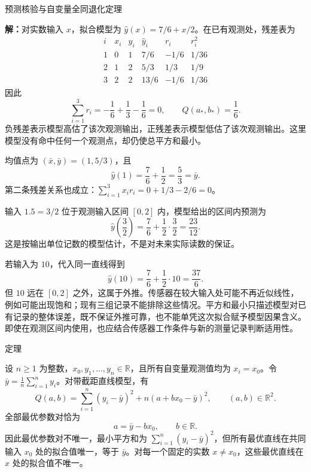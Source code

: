 \documentclass[aspectratio=169,10pt,fontset=fandol]{ctexbeamer}
\begin{document}
\begin{frame}[t,fragile]{预测核验与自变量全同退化定理}
\footnotesize
{\footnotesize
\par\noindent\textbf{解：}对实数输入 $x$，拟合模型为 $\hat{y}(x)=7/6+x/2$。在已有观测处，残差表为
\[
\begin{array}{c|r|r|r|r|r}
i&x_i&y_i&\hat{y}_i&r_i&r_i^2\\ \hline
1&0&1&7/6&-1/6&1/36\\
2&1&2&5/3&1/3&1/9\\
3&2&2&13/6&-1/6&1/36
\end{array}
\]
因此
\[
\sum_{i=1}^{3}r_i=-\frac16+\frac13-\frac16=0,
\qquad Q(a_*,b_*)=\frac16.
\]
负残差表示模型高估了该次观测输出，正残差表示模型低估了该次观测输出。这里模型没有命中任何一个观测点，却仍使总平方和最小。


}
{\footnotesize
均值点为 $(\bar{x},\bar{y})=(1,5/3)$，且
\[
\hat{y}(1)=\frac76+\frac12=\frac53=\bar{y}.
\]
第二条残差关系也成立：$\sum_{i=1}^{3}x_i r_i=0+1/3-2/6=0$。


}
{\footnotesize
输入 $1.5=3/2$ 位于观测输入区间 $[0,2]$ 内，模型给出的区间内预测为
\[
\hat{y}\left(\frac32\right)=\frac76+\frac12\cdot\frac32
=\frac{23}{12}.
\]
这是按输出单位记数的模型估计，不是对未来实际读数的保证。


}
{\footnotesize
若输入为 $10$，代入同一直线得到
\[
\hat{y}(10)=\frac76+\frac12\cdot10=\frac{37}{6}.
\]
但 $10$ 远在 $[0,2]$ 之外，这属于外推。传感器在较大输入处可能不再近似线性，例如可能出现饱和；现有三组记录不能排除这些情况。平方和最小只描述模型对已有记录的整体误差，既不保证外推可靠，也不能单凭这次拟合赋予模型因果含义。即使在观测区间内使用，也应结合传感器工作条件与新的测量记录判断适用性。\par

}
\begin{block}{定理}
{\footnotesize
设 $n\geq1$ 为整数，$x_0,y_1,\ldots,y_n\in\mathbb{R}$，且所有自变量观测值均为 $x_i=x_0$。令 $\bar{y}=\frac1n\sum_{i=1}^{n}y_i$。对带截距直线模型，有
\[
Q(a,b)=\sum_{i=1}^{n}(y_i-\bar{y})^2+n(a+bx_0-\bar{y})^2,
\qquad (a,b)\in\mathbb{R}^2.
\]
全部最优参数对恰为
\[
a=\bar{y}-bx_0,\qquad b\in\mathbb{R}.
\]
因此最优参数对不唯一，最小平方和为 $\sum_{i=1}^{n}(y_i-\bar{y})^2$，但所有最优直线在共同输入 $x_0$ 处的拟合值唯一，等于 $\bar{y}$。对每一个固定的实数 $x\ne x_0$，这些最优直线在 $x$ 处的拟合值不唯一。

}
\end{block}
\end{frame}
\end{document}
